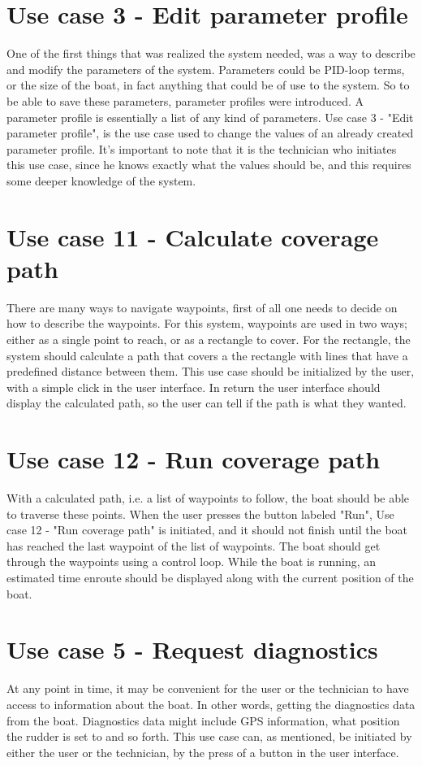 \section{Use case 3 - Edit parameter profile}
One of the first things that was realized the system needed, was a way to describe and modify the parameters of the system. Parameters could be PID-loop terms, or the size of the boat, in fact anything that could be of use to the system. So to be able to save these parameters, parameter profiles were introduced. A parameter profile is essentially a list of any kind of parameters. Use case 3 - "Edit parameter profile", is the use case used to change the values of an already created parameter profile. It's important to note that it is the technician who initiates this use case, since he knows exactly what the values should be, and this requires some deeper knowledge of the system. 

\section{Use case 11 - Calculate coverage path}
There are many ways to navigate waypoints, first of all one needs to decide on how to describe the waypoints. For this system, waypoints are used in two ways; either as a single point to reach, or as a rectangle to cover. For the rectangle, the system should calculate a path that covers a the rectangle with lines that have a predefined distance between them. This use case should be initialized by the user, with a simple click in the user interface. In return the user interface should display the calculated path, so the user can tell if the path is what they wanted.

\section{Use case 12 - Run coverage path}
With a calculated path, i.e. a list of waypoints to follow, the boat should be able to traverse these points. When the user presses the button labeled "Run", Use case 12 - "Run coverage path" is initiated, and it should not finish until the boat has reached the last waypoint of the list of waypoints. The boat should get through the waypoints using a control loop. While the boat is running, an estimated time enroute should be displayed along with the current position of the boat.

\section{Use case 5 - Request diagnostics}
At any point in time, it may be convenient for the user or the technician to have access to information about the boat. In other words, getting the diagnostics data from the boat. Diagnostics data might include GPS information, what position the rudder is set to and so forth. This use case can, as mentioned, be initiated by either the user or the technician, by the press of a button in the user interface. 



